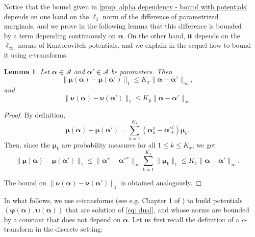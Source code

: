 \documentclass{article}
\def\cA{\mathcal{A}}
\def\aalpha{\boldsymbol{\alpha}}
\def\pphi{\boldsymbol{\varphi}}
\def\ppsi{\boldsymbol{\psi}}
\def\mmu{\boldsymbol{\mu}}
\def\nnu{\boldsymbol{\nu}}
\newtheorem{lem}[thm]{Lemma}
\begin{document}
%
Notice that the bound given in \eqref{prop: alpha dependency - bound with potentials} depends on one hand on the $\ell_1$ norm of the difference of parametrized marginals, and we prove in the following lemma that this difference is bounded by a term depending continuously on $\aalpha$. On the other hand, it depends on the $\ell_\infty$ norms of Kantorovitch potentials, and we explain in the sequel how to bound it using $c$-transforms.
%
\begin{lem} \label{lemma: bound on the marginals}
    Let $\aalpha  \in \cA$ and $\aalpha ' \in \cA$ be parameters. Then
    \begin{equation}
        \| \mmu(\aalpha) - \mmu(\aalpha ') \|_1 \leq K_x \|\aalpha - \aalpha ' \|_\infty , 
    \end{equation}
    and
        \begin{equation}
        \| \nnu(\aalpha) - \nnu(\aalpha ') \|_1 \leq K_y \|\aalpha - \aalpha ' \|_\infty 
    \end{equation}
\end{lem}
%
\begin{proof}
    By definition, 
    \[
        \mmu(\aalpha) - \mmu(\aalpha ') = \sum_{k=1}^{K_x} (\aalpha^x_{k} - \aalpha '^{x}_{k}) \mmu_{k}.
    \]
    Then, since the $\mmu_{k}$ are probability measures for all $1\leq k \leq K_x$, we get 
    \[\| \mmu(\aalpha) - \mmu(\aalpha ') \|_1  \leq \|\aalpha^x - \aalpha'^x \|_\infty \sum_{k=1}^{K_x} \| \mmu_{k} \|_1 \leq K_x \|\aalpha - \aalpha' \|_\infty.\]

  
  The bound on $ \| \nnu(\aalpha) - \nnu(\aalpha ') \|_1 $ is obtained analogously.
\end{proof}
%
In what follows, we use  $c$-transforms (see e.g. Chapter 1 of \cite{santambrogio2015optimal})   to build potentials $(\pphi(\aalpha), \ppsi(\aalpha))$ that are solution of \eqref{eq: dual}, and whose norms are bounded by a constant that does not depend on $\aalpha$. Let us first recall the definition of a $c$-transform in the discrete setting:
\end{document}
